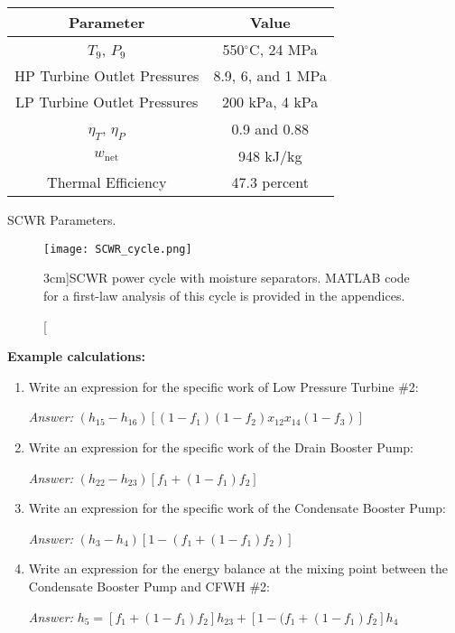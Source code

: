 \begin{margintable}
\begin{tabular}{cc}
\toprule
Parameter & Value \\
\midrule
$T_9$, $P_9$ & 550$^{\circ}$C, 24 MPa \\
HP Turbine Outlet Pressures & 8.9, 6, and 1 MPa \\
LP Turbine Outlet Pressures & 200 kPa, 4 kPa \\
$\eta_T$, $\eta_P$ & 0.9 and 0.88 \\
$w_{\text{net}}$ & 948 kJ/kg \\
Thermal Efficiency & 47.3 percent \\
\bottomrule
\end{tabular}
\caption{SCWR Parameters.}
\label{tab:SCWR_params}
\end{margintable}
\begin{figure}
\texttt{[image: SCWR\_cycle.png]}
\caption[][3cm]{SCWR power cycle with moisture separators. MATLAB code for a first-law analysis of this cycle is provided in the appendices.}
\label{fig:SCWR_cycle}
\end{figure}

\begin{example}
\textbf{Example calculations:} 
\begin{enumerate}
\item Write an expression for the specific work of Low Pressure Turbine \#2:

\emph{Answer:} $(h_{15}-h_{16})\left[(1-f_1)(1-f_2)x_{12}x_{14}(1-f_3) \right]$


\item Write an expression for the specific work of the Drain Booster Pump:

\emph{Answer:} $(h_{22}-h_{23})\left[f_1 + (1-f_1)f_2\right]$

\item Write an expression for the specific work of the Condensate Booster Pump:

\emph{Answer:} $(h_3 - h_4)[1 - (f_1 + (1-f_1)f_2)]$

\item Write an expression for the energy balance at the mixing point between the Condensate Booster Pump and CFWH \#2:

\emph{Answer:} $h_5 = [f_1+(1-f_1)f_2]h_{23} + [1-(f_1+(1-f_1)f_2]h_4$


\end{enumerate}
\end{example}



